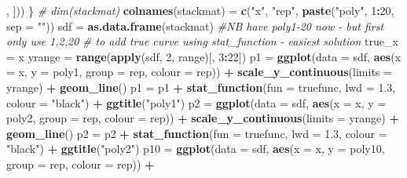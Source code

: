 \documentclass[]{article}
\newenvironment{Shaded}{\begin{snugshade}}{\end{snugshade}}
\newcommand{\CommentTok}[1]{\textcolor[rgb]{0.56,0.35,0.01}{\textit{#1}}}
\newcommand{\DataTypeTok}[1]{\textcolor[rgb]{0.13,0.29,0.53}{#1}}
\newcommand{\DecValTok}[1]{\textcolor[rgb]{0.00,0.00,0.81}{#1}}
\newcommand{\FloatTok}[1]{\textcolor[rgb]{0.00,0.00,0.81}{#1}}
\newcommand{\KeywordTok}[1]{\textcolor[rgb]{0.13,0.29,0.53}{\textbf{#1}}}
\newcommand{\NormalTok}[1]{#1}
\newcommand{\OperatorTok}[1]{\textcolor[rgb]{0.81,0.36,0.00}{\textbf{#1}}}
\newcommand{\StringTok}[1]{\textcolor[rgb]{0.31,0.60,0.02}{#1}}
\begin{document}
\begin{Shaded}
\begin{Highlighting}[]
\NormalTok{        , ]))}
\NormalTok{\}}
\CommentTok{# dim(stackmat)}
\KeywordTok{colnames}\NormalTok{(stackmat) =}\StringTok{ }\KeywordTok{c}\NormalTok{(}\StringTok{"x"}\NormalTok{, }\StringTok{"rep"}\NormalTok{, }\KeywordTok{paste}\NormalTok{(}\StringTok{"poly"}\NormalTok{, }\DecValTok{1}\OperatorTok{:}\DecValTok{20}\NormalTok{, }\DataTypeTok{sep =} \StringTok{""}\NormalTok{))}
\NormalTok{sdf =}\StringTok{ }\KeywordTok{as.data.frame}\NormalTok{(stackmat)  }\CommentTok{#NB have poly1-20 now - but first only use 1,2,20}
\CommentTok{# to add true curve using stat_function - easiest solution}
\NormalTok{true_x =}\StringTok{ }\NormalTok{x}
\NormalTok{yrange =}\StringTok{ }\KeywordTok{range}\NormalTok{(}\KeywordTok{apply}\NormalTok{(sdf, }\DecValTok{2}\NormalTok{, range)[, }\DecValTok{3}\OperatorTok{:}\DecValTok{22}\NormalTok{])}
\NormalTok{p1 =}\StringTok{ }\KeywordTok{ggplot}\NormalTok{(}\DataTypeTok{data =}\NormalTok{ sdf, }\KeywordTok{aes}\NormalTok{(}\DataTypeTok{x =}\NormalTok{ x, }\DataTypeTok{y =}\NormalTok{ poly1, }\DataTypeTok{group =}\NormalTok{ rep, }\DataTypeTok{colour =}\NormalTok{ rep)) }\OperatorTok{+}\StringTok{ }
\StringTok{    }\KeywordTok{scale_y_continuous}\NormalTok{(}\DataTypeTok{limits =}\NormalTok{ yrange) }\OperatorTok{+}\StringTok{ }\KeywordTok{geom_line}\NormalTok{()}
\NormalTok{p1 =}\StringTok{ }\NormalTok{p1 }\OperatorTok{+}\StringTok{ }\KeywordTok{stat_function}\NormalTok{(}\DataTypeTok{fun =}\NormalTok{ truefunc, }\DataTypeTok{lwd =} \FloatTok{1.3}\NormalTok{, }\DataTypeTok{colour =} \StringTok{"black"}\NormalTok{) }\OperatorTok{+}\StringTok{ }
\StringTok{    }\KeywordTok{ggtitle}\NormalTok{(}\StringTok{"poly1"}\NormalTok{)}
\NormalTok{p2 =}\StringTok{ }\KeywordTok{ggplot}\NormalTok{(}\DataTypeTok{data =}\NormalTok{ sdf, }\KeywordTok{aes}\NormalTok{(}\DataTypeTok{x =}\NormalTok{ x, }\DataTypeTok{y =}\NormalTok{ poly2, }\DataTypeTok{group =}\NormalTok{ rep, }\DataTypeTok{colour =}\NormalTok{ rep)) }\OperatorTok{+}\StringTok{ }
\StringTok{    }\KeywordTok{scale_y_continuous}\NormalTok{(}\DataTypeTok{limits =}\NormalTok{ yrange) }\OperatorTok{+}\StringTok{ }\KeywordTok{geom_line}\NormalTok{()}
\NormalTok{p2 =}\StringTok{ }\NormalTok{p2 }\OperatorTok{+}\StringTok{ }\KeywordTok{stat_function}\NormalTok{(}\DataTypeTok{fun =}\NormalTok{ truefunc, }\DataTypeTok{lwd =} \FloatTok{1.3}\NormalTok{, }\DataTypeTok{colour =} \StringTok{"black"}\NormalTok{) }\OperatorTok{+}\StringTok{ }
\StringTok{    }\KeywordTok{ggtitle}\NormalTok{(}\StringTok{"poly2"}\NormalTok{)}
\NormalTok{p10 =}\StringTok{ }\KeywordTok{ggplot}\NormalTok{(}\DataTypeTok{data =}\NormalTok{ sdf, }\KeywordTok{aes}\NormalTok{(}\DataTypeTok{x =}\NormalTok{ x, }\DataTypeTok{y =}\NormalTok{ poly10, }\DataTypeTok{group =}\NormalTok{ rep, }\DataTypeTok{colour =}\NormalTok{ rep)) }\OperatorTok{+}\StringTok{ }

\end{Highlighting}
\end{Shaded}
\end{document}
